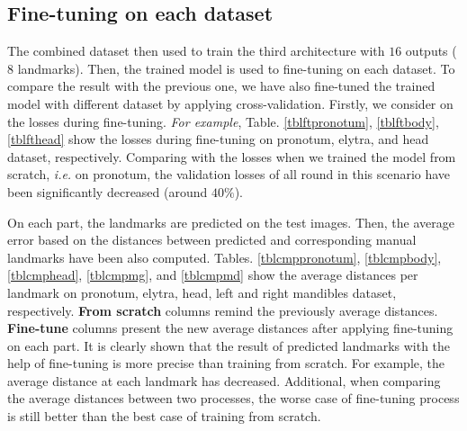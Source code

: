 \documentclass[review]{elsarticle}
\begin{document}
\subsection{Fine-tuning on each dataset}
The combined dataset then used to train the third architecture with $16$ outputs ($8$ landmarks). Then, the trained model is used to fine-tuning on each dataset. To compare the result with the previous one, we have also fine-tuned the trained model with different dataset by applying cross-validation. Firstly, we consider on the losses during fine-tuning. \textit{For example}, Table. \ref{tblftpronotum}, \ref{tblftbody}, \ref{tblfthead} show the losses during fine-tuning on pronotum, elytra, and head dataset, respectively. Comparing with the losses when we trained the model from scratch, \textit{i.e.} on pronotum, the validation losses of all round in this scenario have been significantly decreased (around $40\%$).

On each part, the landmarks are predicted on the test images. Then, the average error based on the distances between predicted and corresponding manual landmarks have been also computed. Tables. \ref{tblcmppronotum}, \ref{tblcmpbody}, \ref{tblcmphead}, \ref{tblcmpmg}, and \ref{tblcmpmd} show the average distances per landmark on pronotum, elytra, head, left and right mandibles dataset, respectively. \textbf{From scratch} columns remind the previously average distances. \textbf{Fine-tune} columns present the new average distances after applying fine-tuning on each part. It is clearly shown that the result of predicted landmarks with the help of fine-tuning is more precise than training from scratch. For example, the average distance at each landmark has decreased. Additional, when comparing the average distances between two processes, the worse case of fine-tuning process is still better than the best case of training from scratch.
\end{document}
